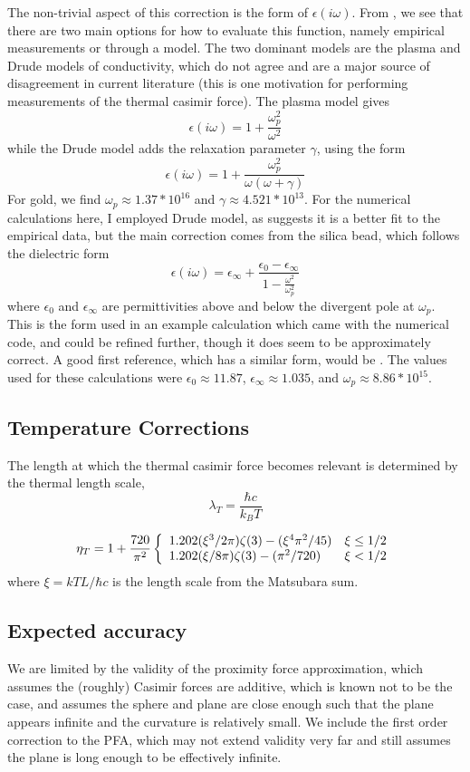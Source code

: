 \documentclass[11pt,traditabstract]{article}
\begin{document}
The non-trivial aspect of this correction is the form of $\epsilon(i\omega)$. From \citet{Lambrecht}, we see that there are two main options for how to evaluate this function, namely empirical measurements or through a model. The two dominant models are the plasma and Drude models of conductivity, which do not agree and are a major source of disagreement in current literature (this is one motivation for performing measurements of the thermal casimir force). The plasma model gives
$$
\epsilon(i\omega)=1+\frac{\omega_p^2}{\omega^2}
$$
while the Drude model adds the relaxation parameter $\gamma$, using the form
$$
\epsilon(i\omega)=1+\frac{\omega_p^2}{\omega(\omega+\gamma)}
$$
For gold, we find $\omega_p\approx1.37*10^{16}$ and $\gamma\approx4.521*10^{13}$. For the numerical calculations here, I employed Drude model, as \citet{Lambrecht} suggests it is a better fit to the empirical data, but the main correction comes from the silica bead, which follows the dielectric form
$$
\epsilon(i\omega)=\epsilon_{\infty} + \frac{\epsilon_{0} - \epsilon_{\infty}}{1 - \frac{\omega^2}{\omega_p^2}}
$$
where $\epsilon_0$ and $\epsilon_\infty$ are permittivities above and below the divergent pole at $\omega_p$. This is the form used in an example calculation which came with the numerical code, and could be refined further, though it does seem to be approximately correct. A good first reference, which has a similar form, would be \citet{Silica}. The values used for these calculations were $\epsilon_0\approx 11.87$, $\epsilon_\infty\approx1.035$, and $\omega_p\approx 8.86*10^{15}$. 

\subsection{Temperature Corrections}

The length at which the thermal casimir force becomes relevant is determined by the thermal length scale,
$$
\lambda_T=\frac{\hbar c}{k_B T}
$$

\citet{Lamoreaux}
$$
\eta_T=1+\frac{720}{\pi^2}\left\{\begin{array}{l r}
1.202(\xi^3/2\pi)\zeta(3)-(\xi^4\pi^2/45)&\xi\le1/2 \\
1.202(\xi/8\pi)\zeta(3)-(\pi^2/720)&\xi < 1/2
\end{array}\right.
$$
where $\xi=kTL/\hbar c$ is the length scale from the Matsubara sum.

\subsection{Expected accuracy}
We are limited by the validity of the proximity force approximation, which assumes the (roughly) Casimir forces are additive, which is known not to be the case, and assumes the sphere and plane are close enough such that the plane appears infinite and the curvature is relatively small. We include the first order correction to the PFA, which may not extend validity very far and still assumes the plane is long enough to be effectively infinite.
\end{document}

